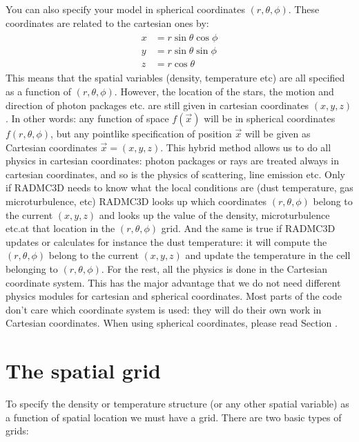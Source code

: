 \documentclass[letterpaper,10pt,english]{sphinxmanual}
\begin{document}
\begin{itemize}
You can also specify your model in spherical coordinates
\((r,\theta,\phi)\). These coordinates are related to the cartesian
ones by:
\begin{equation*}
\begin{split}\begin{split}
x &= r \sin\theta \cos\phi \\
y &= r \sin\theta \sin\phi \\
z &= r \cos\theta
\end{split}\end{split}
\end{equation*}
This means that the spatial variables (density, temperature etc) are all
specified as a function of \((r,\theta,\phi)\). However, the location of the
stars, the motion and direction of photon packages etc. are still given in
cartesian coordinates \((x,y,z)\). In other words: any function of space
\(f(\vec x)\) will be in spherical coordinates \(f(r,\theta,\phi)\), but any
point\sphinxhyphen{}like specification of position \(\vec x\) will be given as Cartesian
coordinates \(\vec x=(x,y,z)\). This hybrid method allows us to do all
physics in cartesian coordinates: photon packages or rays are treated
always in cartesian coordinates, and so is the physics of scattering, line
emission etc.  Only if RADMC\sphinxhyphen{}3D needs to know what the local conditions
are (dust temperature, gas microturbulence, etc) RADMC\sphinxhyphen{}3D looks up which
coordinates \((r,\theta,\phi)\) belong to the current \((x,y,z)\) and looks up
the value of the density, microturbulence etc.at that location in the
\((r,\theta,\phi)\) grid. And the same is true if RADMC\sphinxhyphen{}3D updates or
calculates for instance the dust temperature: it will compute the
\((r,\theta,\phi)\) belong to the current \((x,y,z)\) and update the
temperature in the cell belonging to \((r,\theta,\phi)\). For the rest, all
the physics is done in the Cartesian coordinate system. This has the major
advantage that we do not need different physics modules for cartesian and
spherical coordinates. Most parts of the code don’t care which coordinate
system is used: they will do their own work in Cartesian coordinates.
When using spherical coordinates, please read Section
{\hyperref[\detokenize{gridding:sec-separable-refinement}]{}}.

\end{itemize}


\section{The spatial grid}
\label{\detokenize{basicstructure:the-spatial-grid}}\label{\detokenize{basicstructure:sec-spatial-grid}}
To specify the density or temperature structure (or any other spatial
variable) as a function of spatial location we must have a grid. There
are two basic types of grids:
\end{document}
